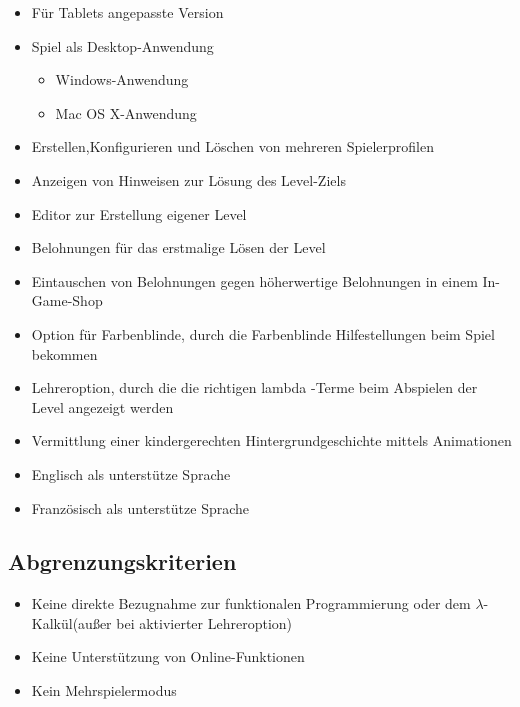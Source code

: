 \begin{itemize}
	\item Für Tablets angepasste Version
	\item Spiel als Desktop-Anwendung
	\begin{itemize}
		\item Windows-Anwendung
		\item Mac OS X-Anwendung
	\end{itemize}
	\item Erstellen,Konfigurieren und Löschen von mehreren Spielerprofilen
	\item Anzeigen von Hinweisen zur Lösung des Level-Ziels
	\item Editor zur Erstellung eigener Level
	\item Belohnungen für das erstmalige Lösen der Level
	\item Eintauschen von Belohnungen gegen höherwertige Belohnungen in einem In-Game-Shop
	\item Option für Farbenblinde, durch die Farbenblinde Hilfestellungen beim Spiel bekommen
	\item Lehreroption, durch die die richtigen lambda -Terme beim Abspielen der Level angezeigt 		  werden
	\item Vermittlung einer kindergerechten Hintergrundgeschichte mittels Animationen
	\item Englisch als unterstütze Sprache
	\item Französisch als unterstütze Sprache
\end{itemize}

\subsection{Abgrenzungskriterien}

\begin{itemize}
	\item Keine direkte Bezugnahme zur funktionalen Programmierung oder dem $\lambda$-Kalkül(außer bei aktivierter Lehreroption) 
	\item Keine Unterstützung von Online-Funktionen
	\item Kein Mehrspielermodus
\end{itemize}
